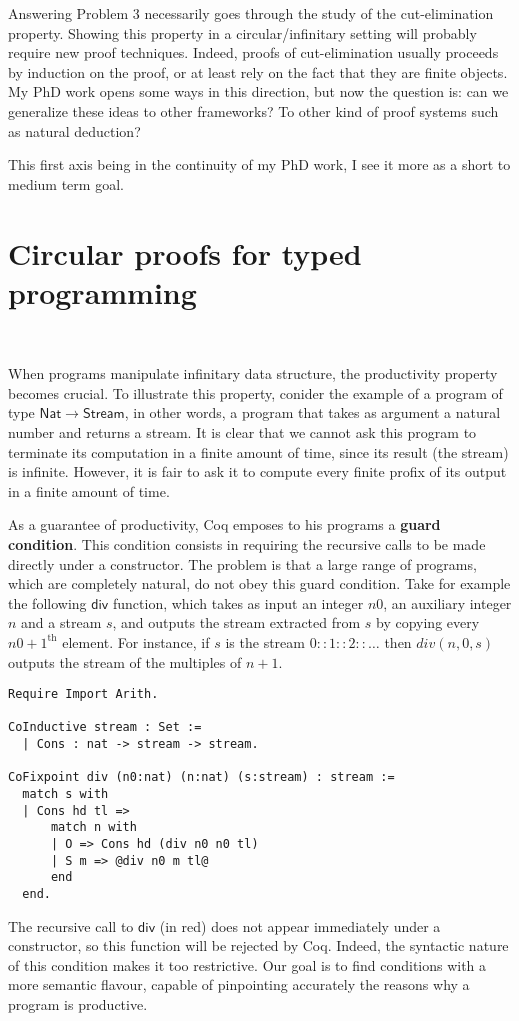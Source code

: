 \documentclass{article}
\begin{document}
\smallskip

Answering Problem 3 necessarily goes through the study of the cut-elimination property.
Showing this property in a circular/infinitary setting will probably require new proof techniques. Indeed, proofs of cut-elimination usually proceeds by induction on the proof, or at least rely on the fact that they are finite objects. 
My PhD work opens some ways in this direction, but now the question is: can we generalize these ideas to other frameworks? To other kind of proof systems such as natural deduction? 


\bigskip

This first axis being in the continuity of my PhD work, I see it more as a short to medium term goal.
  

\section{Circular proofs for typed programming}~\label{CircForProg}

When programs manipulate infinitary data structure, the productivity property becomes crucial. To illustrate this property, conider the example of a program of type $\mathsf{Nat}\rightarrow \mathsf{Stream}$, in other words, a program that takes as argument a natural number and returns a stream. It is clear that we cannot ask this program to terminate its computation in a finite amount of time, since its result (the stream) is infinite. However, 
it is fair to ask it to compute every finite profix of its output in a finite amount of time. 


 
As a guarantee of productivity, Coq emposes to his programs a \textbf{guard condition}.
This condition consists in requiring the recursive calls to be made directly under a constructor. The problem is that a large range of programs, which are completely natural, do not obey this guard condition. Take for example the following $\mathsf{div}$ function, which takes as input an integer $n0$, an auxiliary integer $n$ and a stream $s$, and outputs the stream extracted from $s$ by copying every $n0+1^{\text{th}}$ element. For instance, if $s$ is the stream     
  $0::1::2::\dots$ then $div(n,0,s)$ outputs the stream of the multiples of $n+1$. 
\begin{lstlisting}[style=base]
Require Import Arith.

CoInductive stream : Set :=
  | Cons : nat -> stream -> stream.

CoFixpoint div (n0:nat) (n:nat) (s:stream) : stream :=
  match s with
  | Cons hd tl =>
      match n with
      | O => Cons hd (div n0 n0 tl)
      | S m => @div n0 m tl@
      end
  end.
\end{lstlisting}
The recursive call to $\mathsf{div}$ (in red) does not appear immediately under a constructor, so this function will be rejected by Coq.
  Indeed, the syntactic nature of this condition makes it too restrictive. 
Our goal is to find conditions with a more semantic flavour, capable of pinpointing accurately the reasons why a program is productive.
\end{document}

